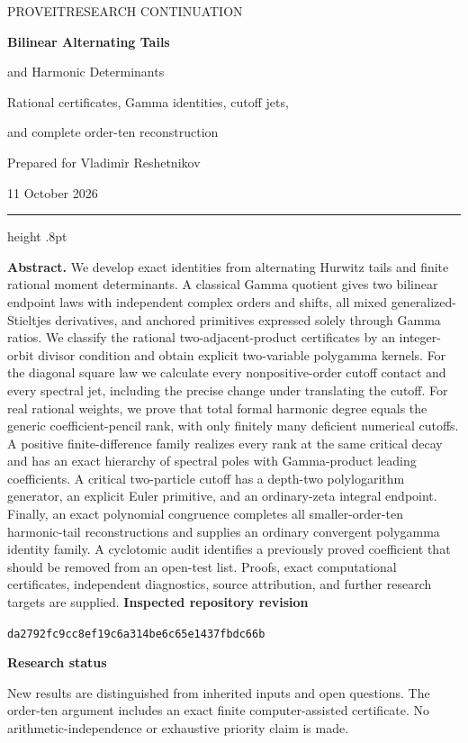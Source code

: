 \documentclass[11pt]{article}
\theoremstyle{definition}
\theoremstyle{remark}
\numberwithin{equation}{section}
\begin{document}
\begin{titlepage}
\thispagestyle{empty}
\vspace*{8mm}
{\large\color{teal}\sffamily PROVEIT\quad RESEARCH CONTINUATION\par}
\vspace{14mm}
{\Huge\bfseries\color{navy}Bilinear Alternating Tails\par
\vspace{3mm}and Harmonic Determinants\par}
\vspace{8mm}
{\Large Rational certificates, Gamma identities, cutoff jets,\par
\vspace{2mm}and complete order-ten reconstruction\par}
\vspace{10mm}
{\large Prepared for Vladimir Reshetnikov\par}
\vspace{2mm}
{11 October 2026\par}
\vspace{11mm}
{\color{teal}\hrule height .8pt}
\vspace{7mm}
\noindent\textbf{Abstract.}
We develop exact identities from alternating Hurwitz tails and finite
rational moment determinants. A classical Gamma quotient gives two
bilinear endpoint laws with independent complex orders and shifts,
all mixed generalized-Stieltjes derivatives, and anchored primitives
expressed solely through Gamma ratios. We classify the rational
two-adjacent-product certificates by an integer-orbit divisor condition
and obtain explicit two-variable polygamma kernels. For the diagonal
square law we calculate every nonpositive-order cutoff contact and
every spectral jet, including the precise change under translating
the cutoff. For real rational weights, we prove that total formal
harmonic degree equals the generic coefficient-pencil rank, with only
finitely many deficient numerical cutoffs. A positive finite-difference
family realizes every rank at the same critical decay and has an exact
hierarchy of spectral poles with Gamma-product leading coefficients. A critical two-particle
cutoff has a depth-two polylogarithm generator, an explicit Euler
primitive, and an ordinary-zeta integral endpoint. Finally, an exact polynomial congruence completes all smaller-order-ten
harmonic-tail reconstructions and supplies an ordinary convergent
polygamma identity family. A cyclotomic audit identifies a previously
proved coefficient that should be removed from an open-test list.
Proofs, exact computational certificates, independent diagnostics,
source attribution, and further research targets are supplied.
\vfill
\noindent\small
\textbf{Inspected repository revision}\par
\texttt{da2792fc9cc8ef19c6a314be6c65e1437fbdc66b}\par
\vspace{3mm}
\textbf{Research status}\par
New results are distinguished from inherited inputs and open questions.
The order-ten argument includes an exact finite computer-assisted
certificate. No arithmetic-independence or exhaustive priority claim
is made.
\end{titlepage}
\end{document}
